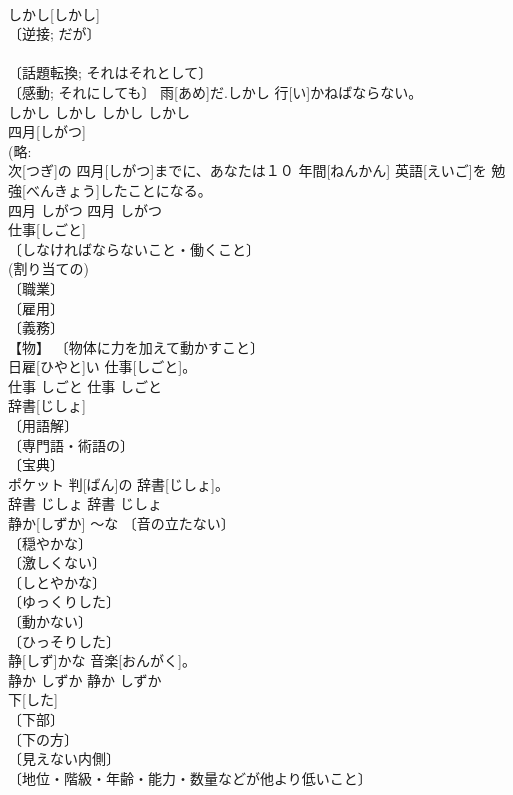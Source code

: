 \documentclass[8pt]{extreport}
\begin{document}
\begin{CJK}{UTF8}{min}
\\	しかし[しかし]	
\\	〔逆接; だが〕 
\\	[⇒しかしながら] 
\\	〔話題転換; それはそれとして〕 
\\	〔感動; それにしても〕	雨[あめ]だ.しかし 行[い]かねばならない。	
\\	しかし	しかし	しかし	しかし	
\\	四月[しがつ]	
\\	(略: 
\\	次[つぎ]の 四月[しがつ]までに、あなたは１０ 年間[ねんかん] 英語[えいご]を 勉強[べんきょう]したことになる。	
\\	四月	しがつ	四月	しがつ	
\\	仕事[しごと]	
\\	〔しなければならないこと・働くこと〕 
\\	(割り当ての) 
\\	〔職業〕 
\\	〔雇用〕 
\\	〔義務〕 
\\	【物】 〔物体に力を加えて動かすこと〕 
\\	日雇[ひやと]い 仕事[しごと]。	
\\	仕事	しごと	仕事	しごと	
\\	辞書[じしょ]	
\\	〔用語解〕 
\\	〔専門語・術語の〕 
\\	〔宝典〕 
\\	ポケット 判[ばん]の 辞書[じしょ]。	
\\	辞書	じしょ	辞書	じしょ	
\\	静か[しずか]	～な 〔音の立たない〕 
\\	〔穏やかな〕 
\\	〔激しくない〕 
\\	〔しとやかな〕 
\\	〔ゆっくりした〕 
\\	〔動かない〕 
\\	〔ひっそりした〕 
\\	静[しず]かな 音楽[おんがく]。	
\\	静か	しずか	静か	しずか	
\\	下[した]	
\\	〔下部〕 
\\	〔下の方〕 
\\	〔見えない内側〕 
\\	〔地位・階級・年齢・能力・数量などが他より低いこと〕 

\end{CJK}
\end{document}
